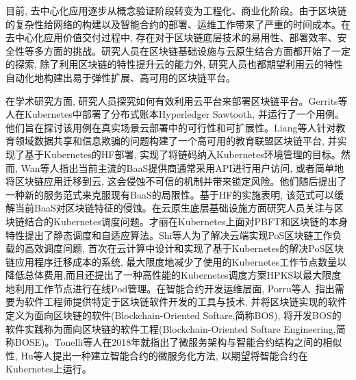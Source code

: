 目前, 去中心化应用逐步从概念验证阶段转变为工程化、商业化阶段。由于区块链的复杂性给网络的构建以及智能合约的部署、运维工作带来了严重的时间成本。在去中心化应用价值交付过程中, 存在对于区块链底层技术的易用性、部署效率、安全性等多方面的挑战。研究人员在区块链基础设施与云原生结合方面都开始了一定的探索, 除了利用区块链的特性提升云的能力外\cite{DBLP:journals/comcom/XieZZWH21}\cite{DBLP:conf/smartcloud/SunWY20}\cite{8457813}, 研究人员也都期望利用云的特性自动化地构建出易于弹性扩展、高可用的区块链平台。

在学术研究方面, 研究人员探究如何有效利用云平台来部署区块链平台。Gerrits等人\cite{DBLP:conf/coins/GerritsKKFV21}在Kubernetes中部署了分布式账本Hyperledger Sawtooth\footnotemark[1], 并运行了一个用例。他们旨在探讨该用例在真实场景云部署中的可行性和可扩展性。Liang等人\cite{liangeduchain}针对教育领域数据共享和信息欺骗的问题构建了一个高可用的教育联盟区块链平台, 并实现了基于Kubernetes的HF部署, 实现了将链码纳入Kubernetes环境管理的目标。然而, Wan等人\cite{wan2018novel}指出当前主流的BaaS提供商通常采用API进行用户访问, 或者简单地将区块链应用迁移到云, 这会侵蚀不可信的机制并带来锁定风险。他们随后提出了一种新的服务范式来克服现有BaaS的局限性。基于HF的实施表明, 该范式可以缓解当前BaaS对区块链特征的侵蚀。在云原生底层基础设施方面研究人员关注与区块链结合的Kubernetes调度问题。才丽\cite{caili2018}在Kubernetes上面对PBFT和区块链的本身特性提出了静态调度和自适应算法。Shi等人\cite{9582270}为了解决云端实现PoS区块链工作负载的高效调度问题, 首次在云计算中设计和实现了基于Kubernetes的解决PoS区块链应用程序迁移成本的系统, 最大限度地减少了使用的Kubernetes工作节点数量以降低总体费用,而且还提出了一种高性能的Kubernetes调度方案HPKS以最大限度地利用工作节点进行在线Pod管理。在智能合约开发运维层面, Porru等人~\cite{porru2017blockchain}指出需要为软件工程师提供特定于区块链软件开发的工具与技术, 并将区块链实现的软件定义为面向区块链的软件(Blockchain-Oriented Softare,简称BOS), 将开发BOS的软件实践称为面向区块链的软件工程(Blockchain-Oriented Softare Engineering,简称BOSE)。Tonelli等人\cite{tonelli2018ethereum}在2018年就指出了微服务架构与智能合约结构之间的相似性, Hu等人\footnotemark[2]提出一种建立智能合约的微服务化方法, 以期望将智能合约在Kubernetes上运行。

